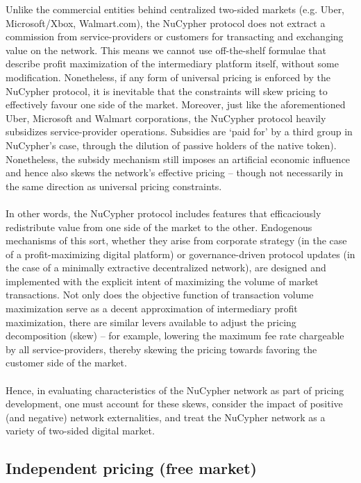 \documentclass[longbibliography,nofootinbib]{revtex4-1}
\begin{document}
Unlike the commercial entities behind centralized two-sided markets (e.g. Uber, Microsoft/Xbox, Walmart.com), the NuCypher protocol does not extract a commission from service-providers or customers for transacting and exchanging value on the network. This means we cannot use off-the-shelf formulae that describe profit maximization of the intermediary platform itself, without some modification. Nonetheless, if any form of universal pricing is enforced by the NuCypher protocol, it is inevitable that the constraints will skew pricing to effectively favour one side of the market. Moreover, just like the aforementioned Uber, Microsoft and Walmart corporations, the NuCypher protocol heavily subsidizes service-provider operations. Subsidies are ‘paid for’ by a third group in NuCypher’s case, through the dilution of passive holders of the native token). Nonetheless, the subsidy mechanism still imposes an artificial economic influence and hence also skews the network’s effective pricing – though not necessarily in the same direction as universal pricing constraints. 
\\\\
In other words, the NuCypher protocol includes features that efficaciously redistribute value from one side of the market to the other. Endogenous mechanisms of this sort, whether they arise from corporate strategy (in the case of a profit-maximizing digital platform) or governance-driven protocol updates (in the case of a minimally extractive decentralized network), are designed and implemented with the explicit intent of maximizing the volume of market transactions. Not only does the objective function of transaction volume maximization serve as a decent approximation of intermediary profit maximization, there are similar levers available to adjust the pricing decomposition (skew) – for example, lowering the maximum fee rate chargeable by all service-providers, thereby skewing the pricing towards favoring the customer side of the market. 
\\\\
Hence, in evaluating characteristics of the NuCypher network as part of pricing development, one must account for these skews, consider the impact of positive (and negative) network externalities, and treat the NuCypher network as a variety of two-sided digital market. 

\subsection{Independent pricing (free market)}
\end{document}
